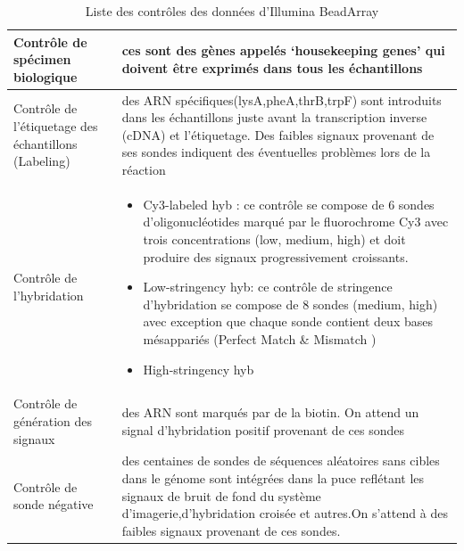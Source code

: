 \documentclass[a4paper,10pt]{article}
\begin{document}
\begin{table}[!ht]
\centering
\begin{tabular}{|p{3cm}|p{9cm}|}
\hline
 Contrôle de spécimen biologique & ces sont des gènes appelés ‘housekeeping genes’ qui doivent être exprimés dans tous les échantillons\\
\hline
Contrôle de l’étiquetage des échantillons (Labeling)   &  des ARN spécifiques(lysA,pheA,thrB,trpF) sont introduits dans les échantillons juste avant la transcription inverse (cDNA) et l’étiquetage. Des faibles signaux provenant de ses sondes indiquent des éventuelles problèmes lors de la réaction \\
\hline 
Contrôle de l’hybridation & 
\begin{itemize}
 \item Cy3-labeled hyb : ce contrôle se compose de 6 sondes d’oligonucléotides marqué par le fluorochrome Cy3 avec trois concentrations (low, medium, high) et doit produire des signaux progressivement croissants.
 \item Low-stringency hyb: ce contrôle de stringence d’hybridation se compose de 8 sondes (medium, high) avec exception que chaque sonde contient deux bases mésappariés  (Perfect Match \& Mismatch )
 \item High-stringency hyb
\end{itemize}
\\
\hline
Contrôle de génération des signaux & des ARN sont marqués par de la biotin. On attend un signal d'hybridation positif provenant de ces sondes\\
\hline
Contrôle de sonde négative & des centaines de sondes de séquences aléatoires sans cibles dans le génome sont intégrées dans la puce reflétant les signaux de bruit de fond du système d'imagerie,d'hybridation croisée et autres.On s'attend à des faibles signaux provenant de ces sondes. \\
\hline
\end{tabular}
\caption{Liste des contrôles des données d'Illumina BeadArray}
\label{Control Illumina}
\end{table}
\end{document}
